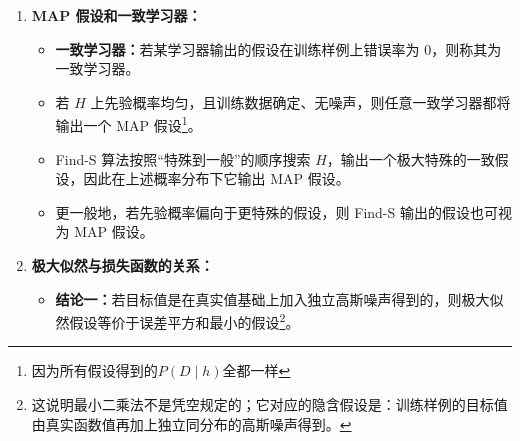 \documentclass[../main.tex]{subfiles}
\begin{document}
\begin{enumerate}
\begin{itemize}
        \item \textbf{结论：}由于所有假设先验相同，
        $$
        P(h)=\frac{1}{|H|}
        $$
        又由于训练数据无噪声，
        $$
        P(D\mid h)=
        \begin{cases}
        1, & \forall d_i,\ d_i=h(x_i) \\
        0, & \text{otherwise}
        \end{cases}
        $$
        因此：
        \begin{itemize}
            \item 若 $h$ 与 $D$ 不一致，则
            $$
            P(h\mid D)=0
            $$
            \item 若 $h$ 与 $D$ 一致，则
            $$
            P(h\mid D)=\frac{1\cdot \frac{1}{|H|}}{P(D)}
            =\frac{\frac{1}{|H|}}{\frac{|VS_{H,D}|}{|H|}}
            =\frac{1}{|VS_{H,D}|}
            $$
        \end{itemize}
        其中 $VS_{H,D}$ 为关于 $D$ 的版本空间，即与 $D$ 一致的假设集合。


    \item \textbf{$P(D)$ 的推导：}
    $$
    P(D)=\sum_{h_i\in H}P(D\mid h_i)P(h_i)
    $$
    在上述条件下，
    $$
    P(D)=\sum_{h_i\in VS_{H,D}}1\cdot \frac{1}{|H|}+\sum_{h_i\notin VS_{H,D}}0\cdot \frac{1}{|H|}
    =\frac{|VS_{H,D}|}{|H|}
    $$

    \item \textbf{结论：}在均匀先验、无噪声、目标概念属于 $H$ 的条件下，每个与 $D$ 一致的假设都是 MAP 假设。
    \end{itemize}
    \item \textbf{MAP 假设和一致学习器：}
    \begin{itemize}
        \item \textbf{一致学习器：}若某学习器输出的假设在训练样例上错误率为 $0$，则称其为一致学习器。
        \item 若 $H$ 上先验概率均匀，且训练数据确定、无噪声，则任意一致学习器都将输出一个 MAP 假设\footnote{因为所有假设得到的$P(D\mid h)$全都一样}。
        \item Find-S 算法按照“特殊到一般”的顺序搜索 $H$，输出一个极大特殊的一致假设，因此在上述概率分布下它输出 MAP 假设。
        \item 更一般地，若先验概率偏向于更特殊的假设，则 Find-S 输出的假设也可视为 MAP 假设。
    \end{itemize}


\item \textbf{极大似然与损失函数的关系：}\label{ML}
\begin{itemize}
    \item \textbf{结论一：}若目标值是在真实值基础上加入独立高斯噪声得到的，则极大似然假设等价于误差平方和最小的假设\footnote{这说明最小二乘法不是凭空规定的；它对应的隐含假设是：训练样例的目标值由真实函数值再加上独立同分布的高斯噪声得到。}。
    

\end{itemize}
\end{enumerate}
\end{document}
